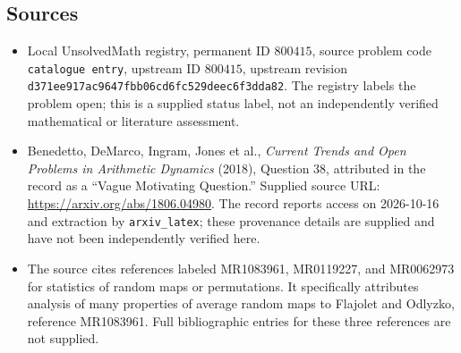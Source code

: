 \documentclass[11pt]{article}
\begin{document}
\subsection{Sources}
\begin{itemize}
\item Local UnsolvedMath registry, permanent ID \(800415\), source problem code \texttt{catalogue entry}, upstream ID \(800415\), upstream revision \texttt{d371ee917ac9647fbb06cd6fc529deec6f3dda82}. The registry labels the problem open; this is a supplied status label, not an independently verified mathematical or literature assessment.
\item Benedetto, DeMarco, Ingram, Jones et al., \emph{Current Trends and Open Problems in Arithmetic Dynamics} (2018), Question 38, attributed in the record as a ``Vague Motivating Question.'' Supplied source URL: \url{https://arxiv.org/abs/1806.04980}. The record reports access on 2026-10-16 and extraction by \texttt{arxiv\_latex}; these provenance details are supplied and have not been independently verified here.
\item The source cites references labeled MR1083961, MR0119227, and MR0062973 for statistics of random maps or permutations. It specifically attributes analysis of many properties of average random maps to Flajolet and Odlyzko, reference MR1083961. Full bibliographic entries for these three references are not supplied.
\end{itemize}
\end{document}
